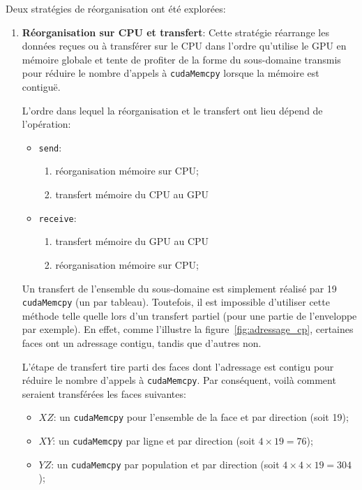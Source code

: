 Deux stratégies de réorganisation ont été explorées:
\begin{enumerate}
\item \textbf{Réorganisation sur \acs{CPU} et transfert}: Cette stratégie réarrange les données reçues ou à transférer sur le \acs{CPU} dans l'ordre qu'utilise le \acs{GPU} en mémoire globale et tente de profiter de la forme du sous-domaine transmis pour réduire le nombre d'appels à \texttt{cudaMemcpy} lorsque la mémoire est contiguë.

L'ordre dans lequel la réorganisation et le transfert ont lieu dépend de l'opération:
\begin{itemize}
\item \texttt{send}:
\begin{enumerate}
\item réorganisation mémoire sur \acs{CPU};
\item transfert mémoire du \acs{CPU} au \acs{GPU}
\end{enumerate}
\item \texttt{receive}:
\begin{enumerate}
	\item transfert mémoire du \acs{GPU} au \acs{CPU}
	\item réorganisation mémoire sur \acs{CPU};
\end{enumerate}
\end{itemize}

Un transfert de l'ensemble du sous-domaine est simplement réalisé par 19 \texttt{cudaMemcpy} (un par tableau). Toutefois, il est impossible d'utiliser cette méthode telle quelle lors d'un transfert partiel (pour une partie de l'enveloppe par exemple). En effet, comme l'illustre la figure~\ref{fig:adressage_cp}, certaines faces ont un adressage contigu, tandis que d'autres non.

L'étape de transfert tire parti des faces dont l'adressage est contigu pour réduire le nombre d'appels à \texttt{cudaMemcpy}. Par conséquent, voilà comment seraient transférées les faces suivantes:
\begin{itemize}
\item $XZ$: un \texttt{cudaMemcpy} pour l'ensemble de la face et par direction (soit 19);
\item $XY$: un \texttt{cudaMemcpy} par ligne et par direction (soit $4\times19 = 76$);
\item $YZ$: un \texttt{cudaMemcpy} par population et par direction (soit $4\times4\times19 = 304$);
\end{itemize}


\end{enumerate}
